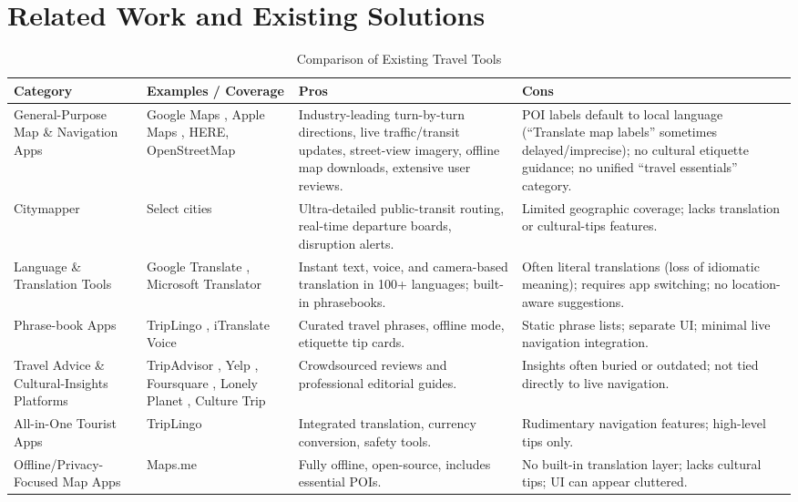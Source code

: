\begin{sloppypar}
\section{Related Work and Existing Solutions}
\begin{table}[H]
  \centering
  \caption{Comparison of Existing Travel Tools}
  \label{tab:travel-tools-comparison}
  \begin{tabular}{|p{3cm}|p{3cm}|p{4cm}|p{4cm}|}
    \hline
    \textbf{Category} & \textbf{Examples / Coverage} & \textbf{Pros} & \textbf{Cons} \\ 
    \hline
    General-Purpose Map \& Navigation Apps &
      Google Maps \cite{googlemaps}, Apple Maps \cite{applemaps}, HERE\cite{herewego}, OpenStreetMap\cite{openstreetmap} &
      Industry-leading turn-by-turn directions, live traffic/transit updates, street-view imagery, offline map downloads, extensive user reviews. &
      POI labels default to local language (“Translate map labels” sometimes delayed/imprecise); no cultural etiquette guidance; no unified “travel essentials” category. \\
    \hline
    Citymapper &
      Select cities \cite{citymapper} &
      Ultra-detailed public-transit routing, real-time departure boards, disruption alerts. &
      Limited geographic coverage; lacks translation or cultural-tips features. \\
    \hline
    Language \& Translation Tools &
      Google Translate \cite{googlet}, Microsoft Translator \cite{mstranslator} &
      Instant text, voice, and camera-based translation in 100+ languages; built-in phrasebooks. &
      Often literal translations (loss of idiomatic meaning); requires app switching; no location-aware suggestions. \\
    \hline
    Phrase-book Apps &
      TripLingo \cite{triplingo}, iTranslate Voice \cite{itranslate} &
      Curated travel phrases, offline mode, etiquette tip cards. &
      Static phrase lists; separate UI; minimal live navigation integration. \\
    \hline
    Travel Advice \& Cultural-Insights Platforms &
      TripAdvisor \cite{tripadvisor}, Yelp \cite{yelp}, Foursquare \cite{foursquare}, Lonely Planet \cite{lonelyplanet}, Culture Trip \cite{culturetrip} &
      Crowdsourced reviews and professional editorial guides. &
      Insights often buried or outdated; not tied directly to live navigation. \\
    \hline
    All-in-One Tourist Apps &
      TripLingo \cite{triplingo} &
      Integrated translation, currency conversion, safety tools. &
      Rudimentary navigation features; high-level tips only. \\
    \hline
    Offline/Privacy-Focused Map Apps &
      Maps.me \cite{mapsme} &
      Fully offline, open-source, includes essential POIs. &
      No built-in translation layer; lacks cultural tips; UI can appear cluttered. \\
    \hline
  \end{tabular}
\end{table}

\end{sloppypar}






